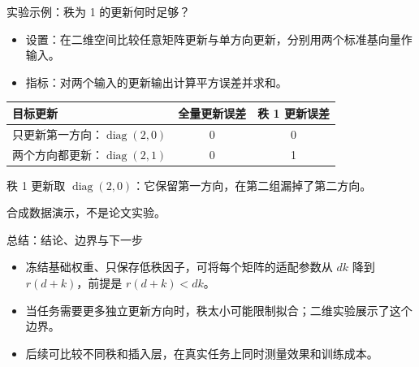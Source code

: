 \documentclass[aspectratio=169,t]{beamer}
\begin{document}
\begin{frame}{实验示例：秩为 1 的更新何时足够？}
  \begin{itemize}
    \item 设置：在二维空间比较任意矩阵更新与单方向更新，分别用两个标准基向量作输入。
    \item 指标：对两个输入的更新输出计算平方误差并求和。
  \end{itemize}
  \vspace{14bp}
  \centering
  \begin{tabular}{lcc}
    \hline
    目标更新 & 全量更新误差 & 秩 1 更新误差 \\
    \hline
    只更新第一方向：$\operatorname{diag}(2,0)$ & 0 & 0 \\
    两个方向都更新：$\operatorname{diag}(2,1)$ & 0 & 1 \\
    \hline
  \end{tabular}\par
  \vspace{12bp}
  {秩 1 更新取 $\operatorname{diag}(2,0)$：它保留第一方向，在第二组漏掉了第二方向。\par}
  \vfill
  {\color{black!65}合成数据演示，不是论文实验。}
\end{frame}

\begin{frame}{总结：结论、边界与下一步}
  \begin{itemize}
    \item 冻结基础权重、只保存低秩因子，可将每个矩阵的适配参数从 $dk$ 降到 $r(d+k)$，前提是 $r(d+k)<dk$。
    \item 当任务需要更多独立更新方向时，秩太小可能限制拟合；二维实验展示了这个边界。
    \item 后续可比较不同秩和插入层，在真实任务上同时测量效果和训练成本。
  \end{itemize}
\end{frame}
\end{document}
